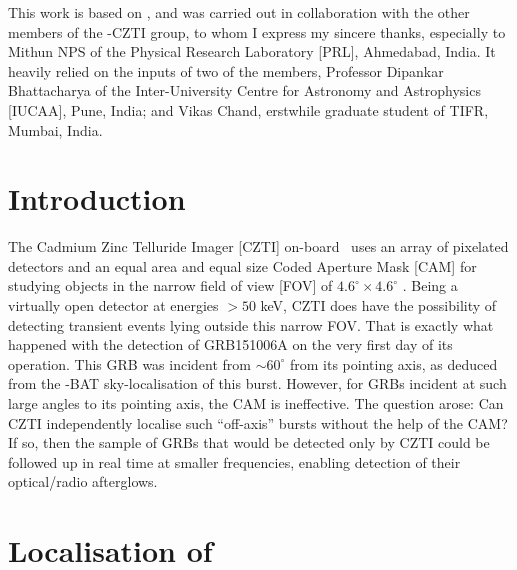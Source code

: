 \begin{checkit}
This work is based on \cite{Rao_et_al.-2016-ApJ}, and was carried out in collaboration with the other members of the \AS -CZTI group, to whom I express my sincere thanks, especially to Mithun NPS of the Physical Research Laboratory [PRL], Ahmedabad, India. It heavily relied on the inputs of two of the members, Professor Dipankar Bhattacharya of the Inter-University Centre for Astronomy and Astrophysics [IUCAA], Pune, India; and Vikas Chand, erstwhile graduate student of TIFR, Mumbai, India.
\end{checkit}


\section{Introduction}
\label{sec:introduction--localisation}
The Cadmium Zinc Telluride Imager [CZTI] on-board \AS\ uses an array of pixelated detectors and an equal area and equal size Coded Aperture Mask [CAM] for studying objects in the narrow field of view [FOV] of $4.6^{\circ} \times 4.6^{\circ}$ \citep{Bhalerao_et_al.-2017-JApA}. Being a virtually open detector at energies $> 50$ keV, CZTI does have the possibility of detecting transient events lying outside this narrow FOV. That is exactly what happened with the detection of GRB151006A on the very first day of its operation. This GRB was incident from $\sim 60^{\circ}$ from its pointing axis, as deduced from the \s -BAT sky-localisation of this burst. However, for GRBs incident at such large angles to its pointing axis, the CAM is ineffective. The question arose: Can CZTI independently localise such ``off-axis'' bursts  without the help of the CAM? If so, then the sample of GRBs that would be detected only by CZTI could be followed up in real time at smaller frequencies, enabling detection of their optical/radio afterglows.

\section{Localisation of \grb}
\label{sec:localisation--body}



